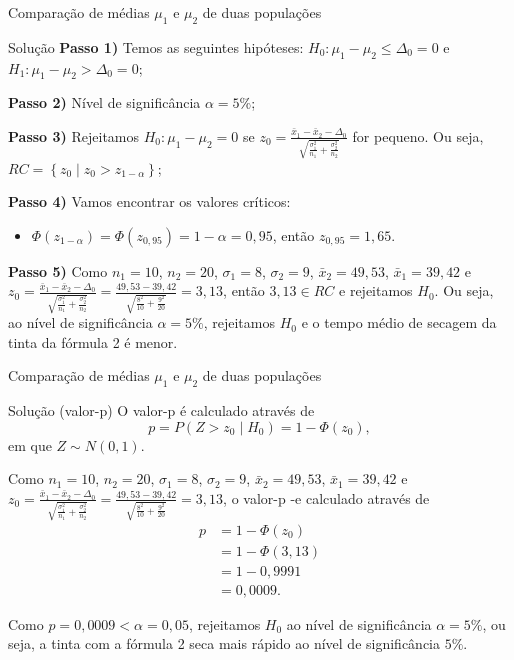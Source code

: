 \documentclass[9pt]{beamer}
\begin{document}
\begin{frame}{Comparação de médias $\mu_1$ e $\mu_2$ de duas populações}

\small

\begin{block}{Solução}
	\textbf{Passo 1)} Temos as seguintes hipóteses: $H_0: \mu_1 - \mu_2 \leq \Delta_0 = 0$ e $H_1: \mu_1 - \mu_2 > \Delta_0 = 0$;
	
	\textbf{Passo 2)} Nível de significância $\alpha = 5\%$;
	
	\textbf{Passo 3)} Rejeitamos $H_0: \mu_1 - \mu_2 = 0$ se $ z_0 =  \frac{\bar{x}_1 - \bar{x}_2 - \Delta_0}{\sqrt{ \frac{\sigma_1^2}{n_1} + \frac{\sigma_2^2}{n_2} }} $ for pequeno. Ou seja, $RC = \left\{ z_0 \mid z_0 > z_{1-\alpha}	 \right\}$;
	 
	 \textbf{Passo 4)} Vamos encontrar os valores críticos:
	 \begin{itemize}
	 	\item $\Phi\left( z_{1-\alpha} \right) = \Phi\left( z_{0,95} \right) = 1-\alpha = 0,95$, então $z_{0,95} = 1,65$.
	 \end{itemize}
 
 	\textbf{Passo 5)} Como $n_1=10$, $n_2=20$, $\sigma_1=8$, $\sigma_2 = 9$, $\bar{x}_2=49,53$, $\bar{x}_1 = 39,42$ e $ z_0  =  \frac{ \bar{x}_1 - \bar{x}_2  -\Delta_0}{ \sqrt{ \frac{\sigma_1^2}{n_1} + \frac{\sigma_2^2}{n_2} } }  = \frac{ 49,53-39,42  }{ \sqrt{ \frac{8^2}{10} + \frac{9^2}{20} }  }  = 3,13$, então $3,13 \in RC$ e rejeitamos $H_0$. Ou seja, ao nível de significância $\alpha=5\%$, rejeitamos $H_0$ e o tempo médio de secagem da tinta da fórmula 2 é menor. 
\end{block}

\normalsize

\end{frame}

\begin{frame}{Comparação de médias $\mu_1$ e $\mu_2$ de duas populações}

\begin{block}{Solução (valor-p)}
	O valor-p é calculado através de
	$$p = P \left(  Z  >  z_0  \mid H_0 \right) =  1 - \Phi \left(z_0\right),$$
	em que $Z \sim N(0,1)$.
	
	Como $n_1=10$, $n_2=20$, $\sigma_1=8$, $\sigma_2 = 9$, $\bar{x}_2=49,53$, $\bar{x}_1 = 39,42$ e $ z_0  = \frac{ \bar{x}_1 - \bar{x}_2 -\Delta_0 }{ \sqrt{ \frac{\sigma_1^2}{n_1} + \frac{\sigma_2^2}{n_2} } }  =  \frac{ 49,53-39,42   }{ \sqrt{ \frac{8^2}{10} + \frac{9^2}{20} }  }  = 3,13$, o valor-p -e calculado através de
	\begin{align*}
		p &= 1 - \Phi \left(z_0\right) \\
		&=  1 - \Phi(3,13) \\
		&=1 - 0,9991\\
		&=0,0009.
	\end{align*}
	
	Como $p=0,0009 < \alpha = 0,05$, rejeitamos $H_0$ ao nível de significância $\alpha=5\%$, ou seja, a tinta com a fórmula 2 seca mais rápido ao nível de significância $5\%$.
\end{block}

\end{frame}
\end{document}
